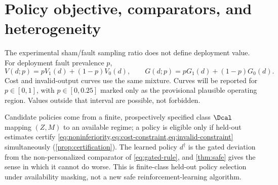 \section{Policy objective, comparators, and heterogeneity}
\label{sec:policy}

The experimental sham/fault sampling ratio does not define deployment value.
For deployment fault prevalence $p$,
\begin{equation}
 V(d;p)=pV_1(d)+(1-p)V_0(d),\qquad
 G(d;p)=pG_1(d)+(1-p)G_0(d).
 \label{eq:prevalence-value}
\end{equation}
Cost and invalid-output curves use the same mixture.  Curves will be reported
for $p\in[0,1]$, with $p\in[0,0.25]$ marked only as the provisional plausible
operating region.  Values outside that interval are possible, not forbidden.

Candidate policies come from a finite, prospectively specified class $\Dcal$
mapping $(Z,M)$ to an available regime; a policy is eligible only if held-out
estimates certify \cref{eq:noninferiority,eq:cost-constraint,eq:invalid-constraint}
simultaneously (\cref{prop:certification}).  The learned policy $d^\dagger$ is
the gated deviation from the non-personalized comparator of
\eqref{eq:gated-rule}, and \cref{thm:safe} gives the sense in which it cannot do
worse.  This is finite-class held-out policy selection under availability
masking, not a new safe reinforcement-learning algorithm.

